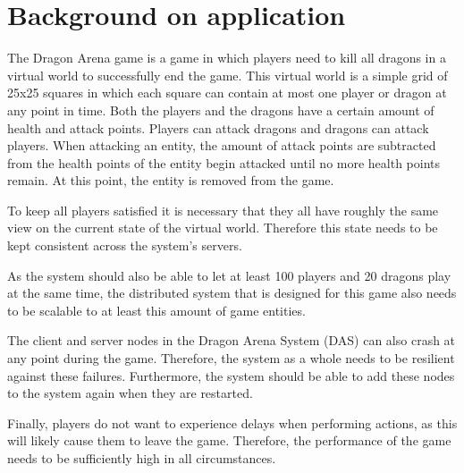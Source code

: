 \section{Background on application}
\label{sec:background}

The Dragon Arena game is a game in which players need to kill all dragons in a virtual world to successfully end the game. 
This virtual world is a simple grid of 25x25 squares in which each square can contain at most one player or dragon at any point in time. 
Both the players and the dragons have a certain amount of health and attack points. 
Players can attack dragons and dragons can attack players. When attacking an entity, the amount of attack points are subtracted from the health points of the entity begin attacked until no more health points remain. At this point, the entity is removed from the game.

To keep all players satisfied it is necessary that they all have roughly the same view on the current state of the virtual world. 
Therefore this state needs to be kept consistent across the system's servers.

As the system should also be able to let at least 100 players and 20 dragons play at the same time, the distributed system that is designed for this game also needs to be scalable to at least this amount of game entities.

The client and server nodes in the Dragon Arena System (DAS) can also crash at any point during the game. 
Therefore, the system as a whole needs to be resilient against these failures. 
Furthermore, the system should be able to add these nodes to the system again when they are restarted.

Finally, players do not want to experience delays when performing actions, as this will likely cause them to leave the game.
Therefore, the performance of the game needs to be sufficiently high in all circumstances.